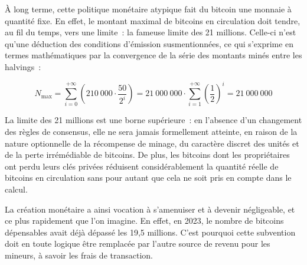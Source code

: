 %
% 
% 


À long terme, cette politique monétaire atypique fait du bitcoin une monnaie à quantité fixe. En effet, le montant maximal de bitcoins en circulation doit tendre, au fil du temps, vers une limite~: la fameuse limite des 21 millions. Celle-ci n'est qu'une déduction des conditions d'émission susmentionnées, ce qui s'exprime en termes mathématiques par la convergence de la série des montants minés entre les halvings~:

{ \small
\[
N_{\mathrm{max}} = \sum_{i=0}^{+\infty} \left( {210~000 \cdot \frac{50}{2^i}} \right) = 21~000~000 \cdot \sum_{i=1}^{+\infty} \left(\frac{1}{2}\right)^i = 21~000~000
\]
}

La limite des 21 millions est une borne supérieure~: en l'absence d'un changement des règles de consensus, elle ne sera jamais formellement atteinte, en raison de la nature optionnelle de la récompense de minage, du caractère discret des unités et de la perte irrémédiable de bitcoins. De plus, les bitcoins dont les propriétaires ont perdu leurs clés privées réduisent considérablement la quantité réelle de bitcoins en circulation sans pour autant que cela ne soit pris en compte dans le calcul.

La création monétaire a ainsi vocation à s'amenuiser et à devenir négligeable, et ce plus rapidement que l'on imagine. En effet, en 2023, le nombre de bitcoins dépensables avait déjà dépassé les 19,5 millions. C'est pourquoi cette subvention doit en toute logique être remplacée par l'autre source de revenu pour les mineurs, à savoir les frais de transaction.

